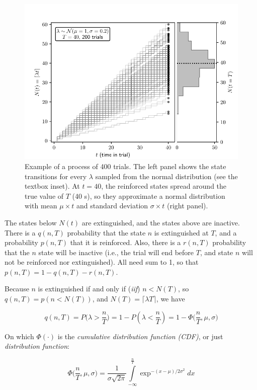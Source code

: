 \documentclass[11pt]{article}
\begin{document}
    \begin{figure}[H]
            \centering
            \includegraphics[scale=0.7]{nt_let}
            \caption{Example of a process of 400 trials. The left panel shows the state transitions for every
                    $\lambda$ sampled from the normal distribution (see the textbox inset). At $t = 40$, the reinforced
                    states spread around the true value of $T$ (40 s), so they approximate a normal distribution with mean
                    $\mu \times t$ and standard deviation $\sigma \times t$ (right panel).}
    \end{figure}
    The states below $N(t)$ are extinguished, and the states above are inactive.
    There is a $q(n,T)$ probability that the state $n$ is extinguished at $T$, and a probability $p(n,T)$ that it is reinforced.
    Also, there is a $r(n,T)$ probability that the $n$ state will be inactive (i.e., the trial will end before $T$, and
    state $n$ will not be reinforced nor extinguished).
    All need sum to 1, so that $p(n,T) = 1 - q(n,T) - r(n,T)$.

Because $n$ is extinguished if and only if (\textit{iif}) $n < N(T)$, so $q(n,T) = p(n < N(T))$,
and $N(T) = \lceil \lambda T \rceil$, we have

    \[
        q(n,T) = P \Big(\lambda > \frac{n}{T}\Big) = 1 - P(\lambda < \frac{n}{T}) = 1 - \Phi \Big (\frac{n}{T}, \mu, \sigma \Big)
    \]


On which $\Phi (\cdot)$ is the \textit{cumulative distribution function (CDF)}, or just \textit{distribution function}:

    \[
        \Phi \Big( \frac{n}{T}, \mu, \sigma \Big) = \frac{1}{\sigma \sqrt{2 \pi}} \int\limits_{-\infty}^{\frac{n}{T}} \exp^{-(x - \mu)/2\sigma^2}dx
    \]
\end{document}
